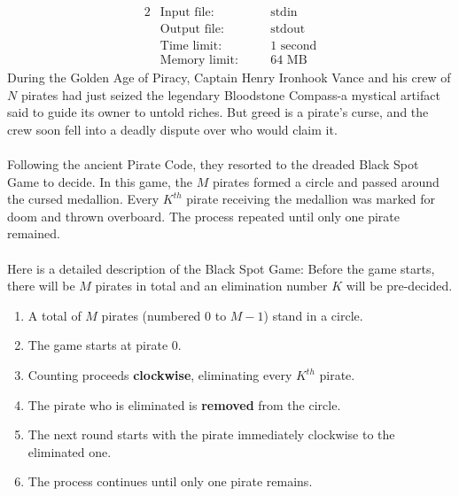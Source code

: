 \documentclass[12pt,a4paper]{article}
\begin{document}
\begin{alignat*} {2}
 &   \text{Input file:}   \quad     &&\text{stdin}\\
 &   \text{Output file:}  \quad     &&\text{stdout}\\
 &   \text{Time limit:}   \quad     &&\text{1 second}\\
 &   \text{Memory limit:} \quad     &&\text{64 MB}
\end{alignat*}
\noindent
During the Golden Age of Piracy, Captain Henry Ironhook Vance and his crew of \(N\) pirates had just seized the legendary Bloodstone Compass-a mystical artifact said to guide its owner to untold riches. 
But greed is a pirate's curse, and the crew soon fell into a deadly dispute over who would claim it.\\
\noindent\\
Following the ancient Pirate Code, they resorted to the dreaded Black Spot Game to decide. 
In this game, the $M$ pirates formed a circle and passed around the cursed medallion. Every $K^{th}$ pirate receiving the medallion was marked for doom and thrown overboard.
The process repeated until only one pirate remained.\\
\noindent\\
Here is a detailed description of the Black Spot Game:
Before the game starts, there will be \(M\) pirates in total and an elimination number \(K\) will be pre-decided.
\begin{enumerate}
    \setlength{\itemsep}{-3pt} %
    \item A total of \(M\) pirates (numbered 0 to \(M-1\)) stand in a circle.
    \item The game starts at pirate 0.
    \item Counting proceeds \textbf{clockwise}, eliminating every \(K^{th}\) pirate.
    \item The pirate who is eliminated is \textbf{removed} from the circle.
    \item The next round starts with the pirate immediately clockwise to the eliminated one.
    \item The process continues until only one pirate remains.
\end{enumerate}
\end{document}
